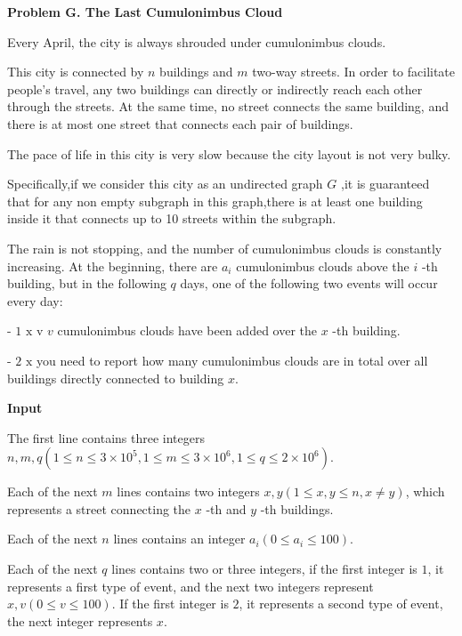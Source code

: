 \documentclass[a4paper]{article}
\begin{document}
\newpage


\textbf{\Large\textsf{Problem G. The Last Cumulonimbus Cloud}}
\vspace{0.01\textheight}

Every April, the city is always shrouded under cumulonimbus clouds.

This city is connected by $n$ buildings and $m$ two-way streets. In order to facilitate people's travel, any two buildings can directly or indirectly reach each other through the streets. At the same time, no street connects the same building, and there is at most one street that connects each pair of buildings.

The pace of life in this city is very slow because the city layout is not very bulky.

Specifically,if we consider this city as an undirected graph $G$ ,it is guaranteed that for any non empty subgraph in this graph,there is at least one building inside it that connects up to 10 streets within the subgraph.

The rain is not stopping, and the number of cumulonimbus clouds is constantly increasing. At the beginning, there are $a_i$ cumulonimbus clouds above the $i$ -th building, but in the following $q$ days, one of the following two events will occur every day:

- $\text{1 x v}$ $v$ cumulonimbus clouds have been added over the $x$ -th building.

- $\text{2 x}$ you need to report how many cumulonimbus clouds are in total over all buildings directly connected to building $x$.

\vspace{0.01\textheight}
\textbf{\textsf{Input}}
\vspace{0.01\textheight}

The first line contains three integers $n,m,q(1\le n\le 3\times 10^5,1\leq m\leq 3\times 10^6, 1\leq q\leq 2\times 10^6)$.

Each of the next $m$ lines contains two integers $x,y(1\leq x,y\leq n,x\neq y)$, which represents a street connecting the $x$ -th and $y$ -th buildings.

Each of the next $n$ lines contains an integer $a_i(0\leq a_i\leq 100)$.

Each of the next $q$ lines contains two or three integers, if the first integer is $1$, it represents a first type of event, and the next two integers represent $x,v(0\leq v\leq 100)$. If the first integer is $2$, it represents a second type of event, the next integer represents $x$.
\end{document}
